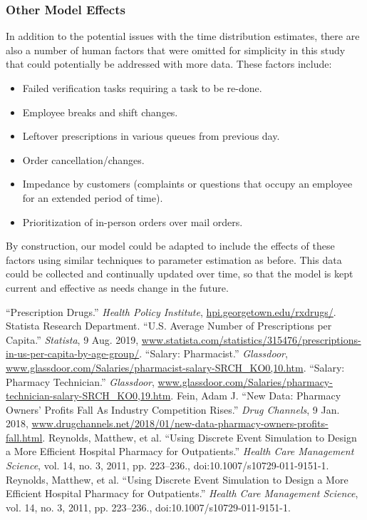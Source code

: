 \documentclass[10pt]{report}            %
\begin{document}
\subsubsection*{Other Model Effects}
In addition to the potential issues with the time distribution estimates, there are also a number of human factors that were omitted for simplicity in this study that could potentially be addressed with more data. These factors include:
\begin{itemize}
\item Failed verification tasks requiring a task to be re-done.
\item Employee breaks and shift changes.
\item Leftover prescriptions in various queues from previous day.
\item Order cancellation/changes.
\item Impedance by customers (complaints or questions that occupy an employee for an extended period of time).
\item Prioritization of in-person orders over mail orders.
\end{itemize}
By construction, our model could be adapted to include the effects of these factors using similar techniques to parameter estimation as before. This data could be collected and continually updated over time, so that the model is kept current and effective as needs change in the future.
\begin{thebibliography}{9}
 ``Prescription Drugs.” \textit{Health Policy Institute}, \url{hpi.georgetown.edu/rxdrugs/}.
 Statista Research Department. ``U.S. Average Number of Prescriptions per Capita.” \textit{Statista}, 9 Aug. 2019, \url{www.statista.com/statistics/315476/prescriptions-in-us-per-capita-by-age-group/}.
 ``Salary: Pharmacist.” \textit{Glassdoor}, \url{www.glassdoor.com/Salaries/pharmacist-salary-SRCH_KO0,10.htm}.
 ``Salary: Pharmacy Technician.” \textit{Glassdoor}, \url{www.glassdoor.com/Salaries/pharmacy-technician-salary-SRCH_KO0,19.htm}.
 Fein, Adam J. ``New Data: Pharmacy Owners' Profits Fall As Industry Competition Rises.” \textit{Drug Channels}, 9 Jan. 2018, \url{www.drugchannels.net/2018/01/new-data-pharmacy-owners-profits-fall.html}.
 Reynolds, Matthew, et al. ``Using Discrete Event Simulation to Design a More Efficient Hospital Pharmacy for Outpatients.” \textit{Health Care Management Science}, vol. 14, no. 3, 2011, pp. 223–236., doi:10.1007/s10729-011-9151-1.
 Reynolds, Matthew, et al. ``Using Discrete Event Simulation to Design a More Efficient Hospital Pharmacy for Outpatients.” \textit{Health Care Management Science}, vol. 14, no. 3, 2011, pp. 223–236., doi:10.1007/s10729-011-9151-1.
\end{thebibliography}
\end{document}
